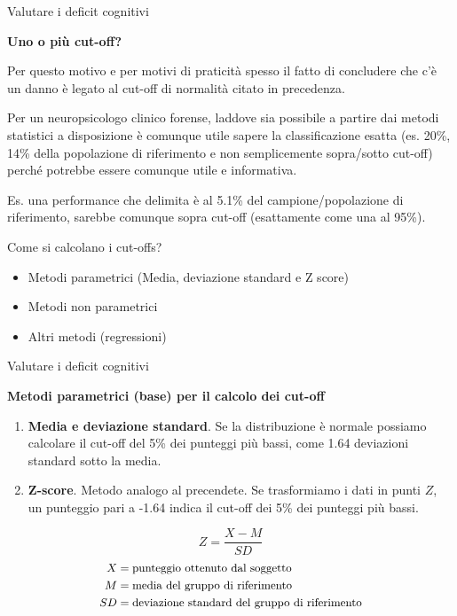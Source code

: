 \documentclass[
  ignorenonframetext,
  aspectratio=169,
]{beamer}
\providecommand{\tightlist}{%
  \setlength{\itemsep}{0pt}\setlength{\parskip}{0pt}}
\begin{document}
\begin{frame}{Valutare i deficit cognitivi}
\label{valutare-i-deficit-cognitivi-8}
\begin{center}
  \textbf{Uno o più cut-off?}
\end{center}

Per questo motivo e per motivi di praticità spesso il fatto di
concludere che c'è un danno è legato al cut-off di normalità citato in
precedenza.

Per un neuropsicologo clinico forense, laddove sia possibile a partire
dai metodi statistici a disposizione è comunque utile sapere la
classificazione esatta (es. 20\%, 14\% della popolazione di riferimento
e non semplicemente sopra/sotto cut-off) perché potrebbe essere comunque
utile e informativa.

Es. una performance che delimita è al 5.1\% del campione/popolazione di
riferimento, sarebbe comunque sopra cut-off (esattamente come una al
95\%).
\end{frame}

\begin{frame}{Come si calcolano i cut-offs?}
\label{come-si-calcolano-i-cut-offs}
\begin{itemize}
\tightlist
\item
  Metodi parametrici (Media, deviazione standard e Z score)
\item
  Metodi non parametrici
\item
  Altri metodi (regressioni)
\end{itemize}
\end{frame}

\begin{frame}{Valutare i deficit cognitivi}
\label{valutare-i-deficit-cognitivi-9}
\begin{center}
  \textbf{Metodi parametrici (base) per il calcolo dei cut-off}
\end{center}

\begin{enumerate}
[1)]
\item
  \textbf{Media e deviazione standard}. Se la distribuzione è normale
  possiamo calcolare il cut-off del 5\% dei punteggi più bassi, come
  1.64 deviazioni standard sotto la media.
\item
  \textbf{Z-score}. Metodo analogo al precendete. Se trasformiamo i dati
  in punti \(Z\), un punteggio pari a -1.64 indica il cut-off dei 5\%
  dei punteggi più bassi.
\end{enumerate}

\[
Z = \frac{X - M}{SD}
\] \[
\small
\begin{aligned}
X & = \text{punteggio ottenuto dal soggetto} \\
M & = \text{media del gruppo di riferimento} \\
SD & = \text{deviazione standard del gruppo di riferimento} \\
\end{aligned}
\]
\end{frame}
\end{document}

